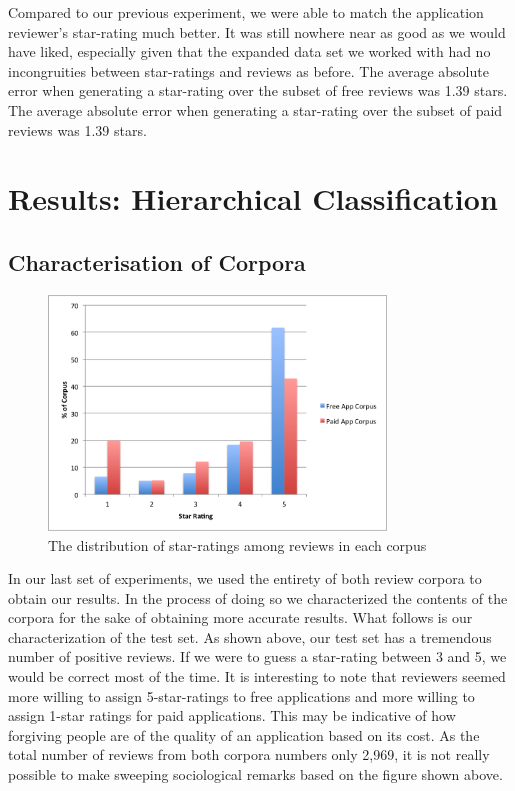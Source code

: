 \documentclass[11pt]{report} %
\begin{document}
Compared to our previous experiment, we were able to match the application reviewer's star-rating much better. It was still nowhere near as good as we would have liked, especially given that the expanded data set we worked with had no incongruities between star-ratings and reviews as before. The average absolute error when generating a star-rating over the subset of free reviews was 1.39 stars. The average absolute error when generating a star-rating over the subset of paid reviews was 1.39 stars.
	

\section{Results: Hierarchical Classification}

	\subsection{Characterisation of Corpora} 

	\begin{figure}[H]
	\centering
	\includegraphics[width=0.8\textwidth]{data/dist_corpora.png}
	\caption{The distribution of star-ratings among reviews in each corpus}
	\label{fig:pmi-hc-corp-dist}
	\end{figure}

In our last set of experiments, we used the entirety of both review corpora to obtain our results. In the process of doing so we characterized the contents of the corpora for the sake of obtaining more accurate results. What follows is our characterization of the test set. As shown above, our test set has a tremendous number of positive reviews. If we were to guess a star-rating between 3 and 5, we would be correct most of the time. It is interesting to note that reviewers seemed more willing to assign 5-star-ratings to free applications and more willing to assign 1-star ratings for paid applications. This may be indicative of how forgiving people are of the quality of an application based on its cost. As the total number of reviews from both corpora numbers only 2,969, it is not really possible to make sweeping sociological remarks based on the figure shown above. 	
\end{document}
